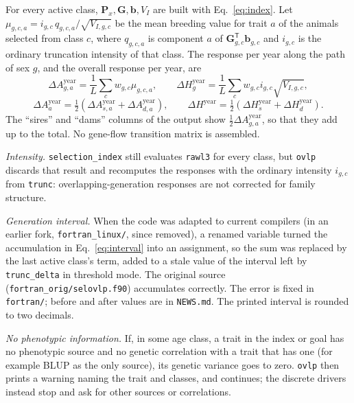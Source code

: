 \documentclass[11pt]{article}
\newcommand{\src}[1]{\texttt{#1}}
\newcommand{\ve}[1]{\boldsymbol{#1}}
\newcommand{\ma}[1]{\mathbf{#1}}
\begin{document}
For every active class, $\ma P_x,\ma G,\ve b,V_I$ are built with Eq.~\eqref{eq:index}. Let $\mu_{g,c,a}=i_{g,c}\,q_{g,c,a}/\sqrt{V_{I,g,c}}$ be the mean breeding value for trait $a$ of the animals selected from class $c$, where $q_{g,c,a}$ is component $a$ of $\ma G_{g,c}^{\mathsf T}\ve b_{g,c}$ and $i_{g,c}$ is the ordinary truncation intensity of that class. The response per year along the path of sex $g$, and the overall response per year, are
\begin{equation}\label{eq:annualpath}
\Delta A_{g,a}^{\mathrm{year}}=\frac1L\sum_c w_{g,c}\mu_{g,c,a},\qquad
\Delta H_g^{\mathrm{year}}=\frac1L\sum_c w_{g,c}i_{g,c}\sqrt{V_{I,g,c}},
\end{equation}
\begin{equation}\label{eq:annual}
\Delta A_a^{\mathrm{year}}=\tfrac12\left(\Delta A_{s,a}^{\mathrm{year}}+\Delta A_{d,a}^{\mathrm{year}}\right),\qquad
\Delta H^{\mathrm{year}}=\tfrac12\left(\Delta H_s^{\mathrm{year}}+\Delta H_d^{\mathrm{year}}\right).
\end{equation}
The ``sires'' and ``dams'' columns of the output show $\tfrac12\Delta A_{g,a}^{\mathrm{year}}$, so that they add up to the total. No gene-flow transition matrix is assembled.

\begin{codenote}
\emph{Intensity.} \src{selection\_index} still evaluates \src{rawl3} for every class, but \src{ovlp} discards that result and recomputes the responses with the ordinary intensity $i_{g,c}$ from \src{trunc}: overlapping-generation responses are not corrected for family structure.

\emph{Generation interval.} When the code was adapted to current compilers (in an earlier fork, \src{fortran\_linux/}, since removed), a renamed variable turned the accumulation in Eq.~\eqref{eq:interval} into an assignment, so the sum was replaced by the last active class's term, added to a stale value of the interval left by \src{trunc\_delta} in threshold mode. The original source (\src{fortran\_orig/selovlp.f90}) accumulates correctly. The error is fixed in \src{fortran/}; before and after values are in \src{NEWS.md}. The printed interval is rounded to two decimals.

\emph{No phenotypic information.} If, in some age class, a trait in the index or goal has no phenotypic source and no genetic correlation with a trait that has one (for example BLUP as the only source), its genetic variance goes to zero. \src{ovlp} then prints a warning naming the trait and classes, and continues; the discrete drivers instead stop and ask for other sources or correlations.
\end{codenote}
\end{document}
